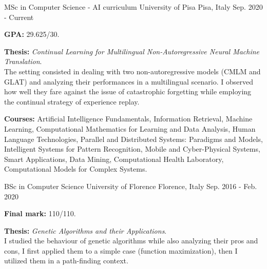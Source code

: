 

\begin{cventries}

\cventry
{MSc in Computer Science - AI curriculum} %
{University of Pisa} %
{Pisa, Italy} %
{Sep. 2020 - Current} %
{
    \begin{cvitems} %
        \item{\textbf{GPA:} 29.625/30.}
        \item{\textbf{Thesis:} \textit{Continual Learning for Multilingual Non-Autoregressive Neural Machine Translation}.\\
        The setting consisted in dealing with two non-autoregressive models (CMLM and GLAT) and analyzing their performances in a multilingual scenario. I observed how well they fare against the issue of catastrophic forgetting while employing the continual strategy of experience replay.}
        \item{\textbf{Courses:} Artificial Intelligence Fundamentals, Information Retrieval, Machine Learning, Computational Mathematics for Learning and Data Analysis, Human Language Technologies, Parallel and Distributed Systems: Paradigms and Models, Intelligent Systems for Pattern Recognition, Mobile and Cyber-Physical Systems, Smart Applications, Data Mining, Computational Health Laboratory, Computational Models for Complex Systems.}
    \end{cvitems}
}

\cventry
{BSc in Computer Science}
{University of Florence}
{Florence, Italy}
{Sep. 2016 - Feb. 2020}
{
    \begin{cvitems}
        \item{\textbf{Final mark:} 110/110.}
        \item{\textbf{Thesis:} \textit{Genetic Algorithms and their Applications}.\\
        I studied the behaviour of genetic algorithms while also analyzing their pros and cons, I first applied them to a simple case (function maximization), then I utilized them in a path-finding context.}
    \end{cvitems}
}


\end{cventries}
